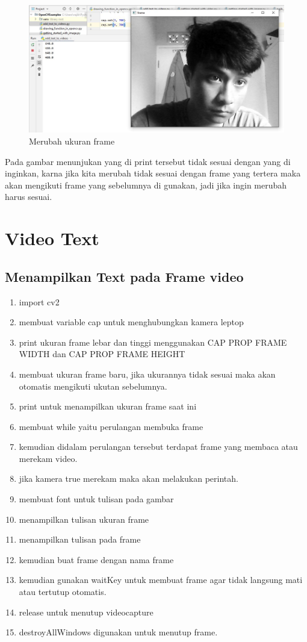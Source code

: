 \begin{figure}[ht]
\centering
\includegraphics[scale=0.42]{figures/2,16.jpg}
\caption{Merubah ukuran frame}
\label{contoh}
\end{figure}

Pada gambar menunjukan yang di print tersebut tidak sesuai dengan yang di inginkan, karna jika kita merubah tidak sesuai dengan frame yang tertera maka akan mengikuti frame yang sebelumnya di gunakan, jadi jika ingin merubah harus sesuai.



\newpage
\section{Video Text}
\subsection{Menampilkan Text pada Frame video}

\begin{enumerate}
	\item import cv2
	\item membuat variable cap untuk menghubungkan kamera leptop
	\item print ukuran frame lebar dan tinggi menggunakan CAP PROP FRAME WIDTH dan CAP PROP FRAME HEIGHT
	\item membuat ukuran frame baru, jika ukurannya tidak sesuai maka akan otomatis mengikuti ukutan sebelumnya.
	\item print untuk menampilkan ukuran frame saat ini
	\item membuat while yaitu perulangan membuka frame
	\item kemudian didalam perulangan tersebut terdapat frame yang membaca atau merekam video.
	\item jika kamera true merekam maka akan melakukan perintah. 
	\item membuat font untuk tulisan pada gambar
	\item menampilkan tulisan ukuran frame
	\item menampilkan tulisan pada frame
	\item kemudian buat frame dengan nama frame
	\item kemudian gunakan waitKey untuk membuat frame agar tidak langsung mati atau tertutup otomatis.
	\item release untuk menutup videocapture
	\item destroyAllWindows digunakan untuk menutup frame.
\end{enumerate}

